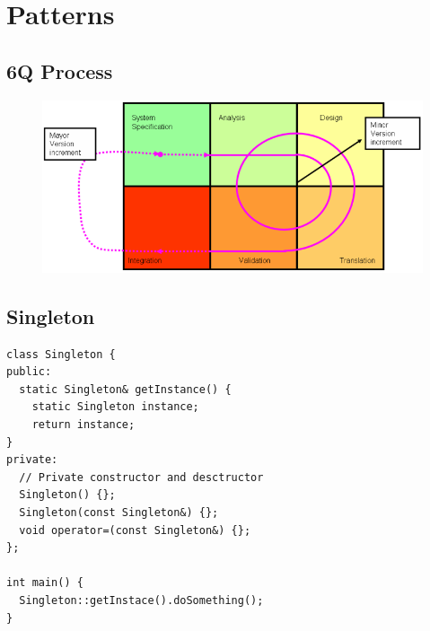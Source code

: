 \section{Patterns}
%
\subsection{6Q Process}
\begin{figure}[H]
    \centering
    \includegraphics[width=0.9\linewidth]{figures/6Q.png}
\end{figure}
%
\subsection{Singleton}
\begin{lstlisting}[style=Cpp]
class Singleton {
public:
  static Singleton& getInstance() {
    static Singleton instance;
    return instance;
}
private:
  // Private constructor and desctructor
  Singleton() {};
  Singleton(const Singleton&) {};
  void operator=(const Singleton&) {};
};

int main() {
  Singleton::getInstace().doSomething();
}
\end{lstlisting}
%
